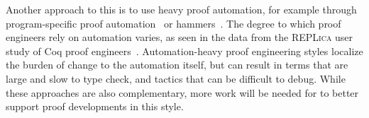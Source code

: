 Another approach to this is to use heavy proof automation, for example through
program-specific proof automation~\cite{Chlipala:2013:CPD:2584504}
or hammers~\cite{Blanchette2016b, Blanchette2013, Kaliszyk2014, Czajka2018}.
The degree to which proof engineers rely on automation varies, as seen in the data from the
\textsc{REPLica} user study of Coq proof engineers~\cite{replica}.
Automation-heavy proof engineering styles localize the burden of change to the automation itself,
but can result in terms that are large and slow to type check,
and tactics that can be difficult to debug.
While these approaches are also complementary, more work will be needed for \toolname to better support 
proof developments in this style.



